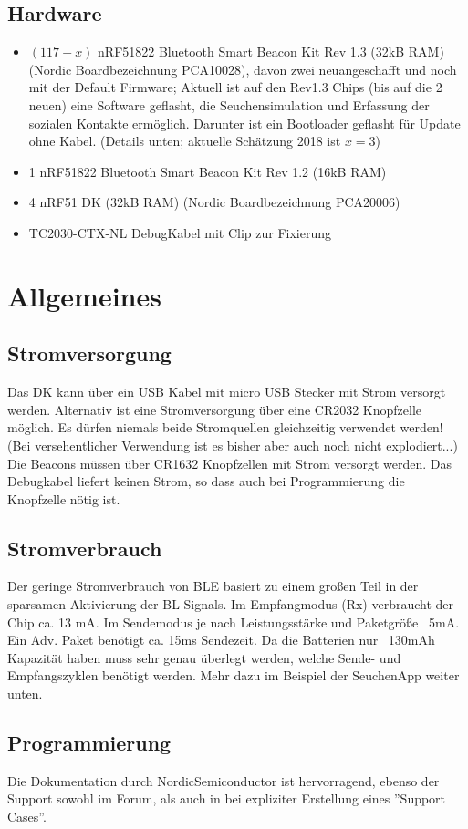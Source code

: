 \documentclass[11pt,ngerman]{scrartcl} %
\begin{document}
\subsection{Hardware}
\begin{itemize}
\item $(117-x)$ nRF51822 Bluetooth Smart Beacon Kit Rev 1.3 (32kB RAM) (Nordic Boardbezeichnung PCA10028), davon zwei neuangeschafft und noch mit der Default Firmware; Aktuell ist auf den Rev1.3 Chips (bis auf die 2 neuen) eine Software geflasht, die Seuchensimulation und Erfassung der sozialen Kontakte ermöglich. Darunter ist ein Bootloader geflasht für Update ohne Kabel. (Details unten; aktuelle Schätzung 2018 ist $x=3$)
\item 1 nRF51822 Bluetooth Smart Beacon Kit Rev 1.2 (16kB RAM)
\item 4 nRF51 DK (32kB RAM) (Nordic Boardbezeichnung PCA20006)
\item TC2030-CTX-NL  DebugKabel mit Clip zur Fixierung
\end{itemize}
\section{Allgemeines}
\subsection{Stromversorgung}
Das DK kann über ein USB Kabel mit micro USB Stecker mit Strom versorgt werden. Alternativ ist eine Stromversorgung über eine CR2032 Knopfzelle möglich. Es dürfen niemals beide Stromquellen gleichzeitig verwendet werden! (Bei versehentlicher Verwendung ist es bisher aber auch noch nicht explodiert...)
Die Beacons müssen über CR1632 Knopfzellen mit Strom versorgt werden. Das Debugkabel liefert keinen Strom, so dass auch bei Programmierung die Knopfzelle nötig ist.

\subsection{Stromverbrauch}
Der geringe Stromverbrauch von BLE basiert zu einem großen Teil in der sparsamen Aktivierung der BL Signals. Im Empfangmodus (Rx) verbraucht der Chip ca. 13 mA. Im Sendemodus je nach Leistungsstärke und Paketgröße ~5mA. Ein Adv. Paket benötigt ca. 15ms Sendezeit. Da die Batterien nur ~130mAh Kapazität haben muss sehr genau überlegt werden, welche Sende- und Empfangszyklen benötigt werden. Mehr dazu im Beispiel der SeuchenApp weiter unten.
\subsection{Programmierung}
Die Dokumentation durch NordicSemiconductor ist hervorragend, ebenso der Support sowohl im Forum, als auch in bei expliziter Erstellung eines ''Support Cases''. 
\end{document}
